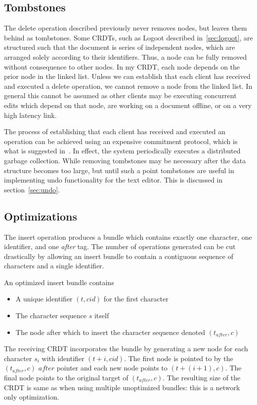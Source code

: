 \documentclass[12pt,a4paper,twoside,openright]{report}
\begin{document}
		\subsection{Tombstones}
			The delete operation described previously never removes nodes, but leaves them behind as tombstones. Some CRDTs, such as Logoot described in~\cref{sec:logoot}, are structured such that the document is series of independent nodes, which are arranged solely according to their identifiers. Thus, a node can be fully removed without consequence to other nodes. In my CRDT, each node depends on the prior node in the linked list. Unless we can establish that each client has received and executed a delete operation, we cannot remove a node from the linked list. In general this cannot be assumed as other clients may be executing concurrent edits which depend on that node, are working on a document offline, or on a very high latency link.
			
			The process of establishing that each client has received and executed an operation can be achieved using an expensive commitment protocol, which is what is suggested in~\cite{preguica2009}. In effect, the system periodically executes a distributed garbage collection. While removing tombstones may be necessary after the data structure becomes too large, but until such a point tombstones are useful in implementing undo functionality for the text editor. This is discussed in section~\cref{sec:undo}.
			
		
		\subsection{Optimizations}
			The insert operation produces a bundle which contains exactly one character, one identifier, and one \textit{after} tag. The number of operations generated can be cut drastically by allowing an insert bundle to contain a contiguous sequence of characters and a single identifier.
			
			An optimized insert bundle contains
			\begin{itemize}
				\item A unique identifier  $(t, cid)$ for the first character
				\item The character sequence $s$ itself
				\item The node after which to insert the character sequence denoted $(t_{after}, c)$
			\end{itemize}
			
			The receiving CRDT incorporates the bundle by generating a new node for each character $s_i$ with identifier $(t + i, cid)$. The first node is pointed to by the $(t_{after}, c)$ $after$ pointer and each new node points to $(t + (i+1), c)$. The final node points to the original target of $(t_{after}, c)$. The resulting size of the CRDT is same as when using multiple unoptimized bundles: this is a network only optimization.
			
\end{document}
